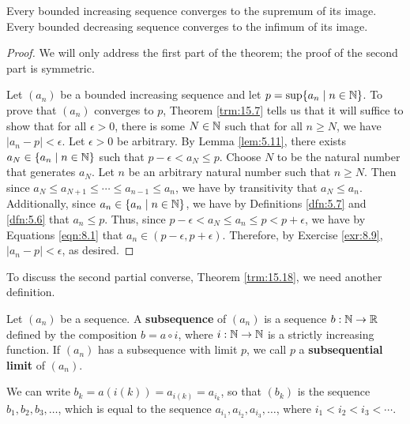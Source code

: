 \documentclass[../main.tex]{subfiles}
\begin{document}
\begin{theorem}\label{trm:15.14}
    Every bounded increasing sequence converges to the supremum of its image. Every bounded decreasing sequence converges to the infimum of its image.
    \begin{proof}
        We will only address the first part of the theorem; the proof of the second part is symmetric.\par
        Let $(a_n)$ be a bounded increasing sequence and let $p=\sup\{a_n\mid n\in\mathbb{N}\}$. To prove that $(a_n)$ converges to $p$, Theorem \ref{trm:15.7} tells us  that it will suffice to show that for all $\epsilon>0$, there is some $N\in\mathbb{N}$ such that for all $n\geq N$, we have $|a_n-p|<\epsilon$. Let $\epsilon>0$ be arbitrary. By Lemma \ref{lem:5.11}, there exists $a_N\in\{a_n\mid n\in\mathbb{N}\}$ such that $p-\epsilon<a_N\leq p$. Choose $N$ to be the natural number that generates $a_N$. Let $n$ be an arbitrary natural number such that $n\geq N$. Then since $a_N\leq a_{N+1}\leq\cdots\leq a_{n-1}\leq a_n$, we have by transitivity that $a_N\leq a_n$. Additionally, since $a_n\in\{a_n\mid n\in\mathbb{N}\}$, we have by Definitions \ref{dfn:5.7} and \ref{dfn:5.6} that $a_n\leq p$. Thus, since $p-\epsilon<a_N\leq a_n\leq p<p+\epsilon$, we have by Equations \ref{eqn:8.1} that $a_n\in(p-\epsilon,p+\epsilon)$. Therefore, by Exercise \ref{exr:8.9}, $|a_n-p|<\epsilon$, as desired.
    \end{proof}
\end{theorem}

To discuss the second partial converse, Theorem \ref{trm:15.18}, we need another definition.

\begin{definition}\label{dfn:15.15}
    Let $(a_n)$ be a sequence. A \textbf{subsequence} of $(a_n)$ is a sequence $b:\mathbb{N}\to\mathbb{R}$ defined by the composition $b=a\circ i$, where $i:\mathbb{N}\to\mathbb{N}$ is a strictly increasing function. If $(a_n)$ has a subsequence with limit $p$, we call $p$ a \textbf{subsequential limit} of $(a_n)$.
\end{definition}

We can write $b_k=a(i(k))=a_{i(k)}=a_{i_k}$, so that $(b_k)$ is the sequence $b_1,b_2,b_3,\dots$, which is equal to the sequence $a_{i_1},a_{i_2},a_{i_3},\dots$, where $i_1<i_2<i_3<\cdots$.
\end{document}
